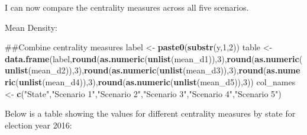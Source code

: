 \documentclass[]{article}
\newenvironment{Shaded}{\begin{snugshade}}{\end{snugshade}}
\newcommand{\KeywordTok}[1]{\textcolor[rgb]{0.13,0.29,0.53}{\textbf{#1}}}
\newcommand{\DataTypeTok}[1]{\textcolor[rgb]{0.13,0.29,0.53}{#1}}
\newcommand{\DecValTok}[1]{\textcolor[rgb]{0.00,0.00,0.81}{#1}}
\newcommand{\StringTok}[1]{\textcolor[rgb]{0.31,0.60,0.02}{#1}}
\newcommand{\OtherTok}[1]{\textcolor[rgb]{0.56,0.35,0.01}{#1}}
\newcommand{\OperatorTok}[1]{\textcolor[rgb]{0.81,0.36,0.00}{\textbf{#1}}}
\newcommand{\NormalTok}[1]{#1}
\begin{document}
I can now compare the centrality measures across all five scenarios.

Mean Density:

\begin{Shaded}
\begin{Highlighting}[]
\NormalTok{##Combine centrality measures}
\NormalTok{label <-}\StringTok{ }\KeywordTok{paste0}\NormalTok{(}\KeywordTok{substr}\NormalTok{(y,}\DecValTok{1}\NormalTok{,}\DecValTok{2}\NormalTok{))}
\NormalTok{table <-}\StringTok{ }\KeywordTok{data.frame}\NormalTok{(label,}\KeywordTok{round}\NormalTok{(}\KeywordTok{as.numeric}\NormalTok{(}\KeywordTok{unlist}\NormalTok{(mean_d1)),}\DecValTok{3}\NormalTok{),}\KeywordTok{round}\NormalTok{(}\KeywordTok{as.numeric}\NormalTok{(}\KeywordTok{unlist}\NormalTok{(mean_d2)),}\DecValTok{3}\NormalTok{),}\KeywordTok{round}\NormalTok{(}\KeywordTok{as.numeric}\NormalTok{(}\KeywordTok{unlist}\NormalTok{(mean_d3)),}\DecValTok{3}\NormalTok{),}\KeywordTok{round}\NormalTok{(}\KeywordTok{as.numeric}\NormalTok{(}\KeywordTok{unlist}\NormalTok{(mean_d4)),}\DecValTok{3}\NormalTok{),}\KeywordTok{round}\NormalTok{(}\KeywordTok{as.numeric}\NormalTok{(}\KeywordTok{unlist}\NormalTok{(mean_d5)),}\DecValTok{3}\NormalTok{))}
\NormalTok{col_names <-}\StringTok{ }\KeywordTok{c}\NormalTok{(}\StringTok{"State"}\NormalTok{,}\StringTok{"Scenario 1"}\NormalTok{,}\StringTok{"Scenario 2"}\NormalTok{,}\StringTok{"Scenario 3"}\NormalTok{,}\StringTok{"Scenario 4"}\NormalTok{,}\StringTok{"Scenario 5"}\NormalTok{)}
\end{Highlighting}
\end{Shaded}

Below is a table showing the values for different centrality measures by
state for election year 2016:

\begin{Shaded}
\end{Shaded}
\end{document}
